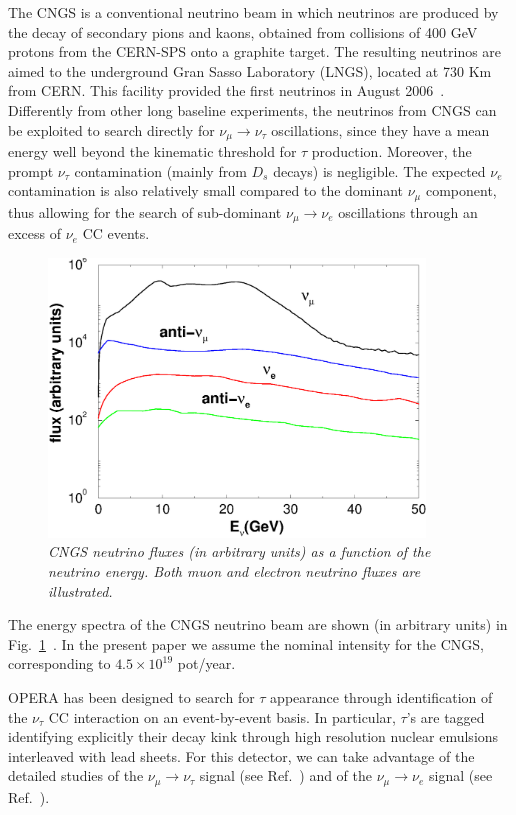 \documentclass[12pt]{elsart}
\begin{document}
The CNGS is a conventional neutrino beam in which neutrinos are
produced by the decay of secondary pions and kaons, obtained from
collisions of 400 GeV protons from the CERN-SPS onto a graphite
target. The resulting neutrinos are aimed to the underground Gran
Sasso Laboratory (LNGS), located at 730 Km from CERN. This facility
provided the first neutrinos in August 2006~\cite{Acquafredda:2006ki}.
Differently from other long baseline experiments, the neutrinos from
CNGS can be exploited to search directly for $\nu_\mu \to
\nu_\tau$ oscillations, since they have a mean energy well beyond the
kinematic threshold for $\tau$ production. Moreover, the prompt
$\nu_\tau$ contamination (mainly from $D_s$ decays) is negligible. The
expected $\nu_e$ contamination is also relatively small compared to
the dominant $\nu_\mu$ component, thus allowing for the search of
sub-dominant $\nu_\mu \to \nu_e$ oscillations through an excess of
$\nu_e$ CC events.

\begin{figure}[t] \centering
    \includegraphics[width=10cm]{fig.fluxes.eps}
    \caption{\label{fig:fluxes}\sl%
      CNGS neutrino fluxes (in arbitrary units) as a function of the
      neutrino energy.  Both muon and electron neutrino fluxes are
      illustrated.}
\end{figure}

The energy spectra of the CNGS neutrino beam are shown (in arbitrary
units) in Fig.~\ref{fig:fluxes}~\cite{fluxes}. In the present paper we
assume the nominal intensity for the CNGS, corresponding to $4.5
\times 10^{19}$ pot/year.

OPERA has been designed to search for $\tau$ appearance through
identification of the $\nu_\tau$ CC interaction on an event-by-event
basis. In particular, $\tau$'s are tagged identifying explicitly their
decay kink through high resolution nuclear emulsions interleaved with
lead sheets.  For this detector, we can take advantage of the detailed
studies of the $\nu_\mu \to \nu_\tau$ signal (see
Ref.~\cite{Migliozzi:2006fy}) and of the $\nu_\mu \to \nu_e$ signal
(see Ref.~\cite{Komatsu:2002sz}).
\end{document}
